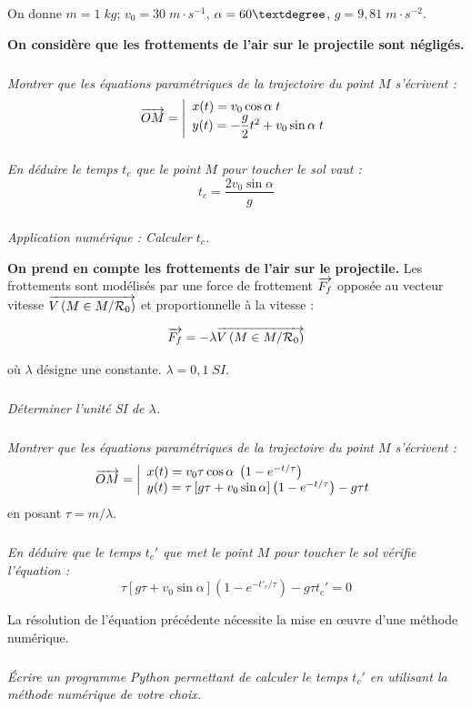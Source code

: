 \documentclass[10pt,oneside]{article}
\begin{document}
On donne $m=1\; kg$; $v_0 = 30\; m \cdot s^{-1}$, $\alpha = 60\textdegree$, $g=9,81\; m\cdot s^{-2}$. 

\textbf{On considère que les frottements de l'air sur le projectile sont négligés.}

\subparagraph{\label{1a}}
\textit{Montrer que les équations paramétriques de la trajectoire du point $M$ s'écrivent :}
\begin{equation}
\overrightarrow{OM} = \left|
\begin{array}{l}
x(t)= v_0 \cos \alpha \; t \\
y(t)=-\dfrac{g}{2}t^2 + v_0 \sin \alpha \; t
\end{array}
\right.
\end{equation}

\subparagraph{\label{1b}}
\textit{En déduire le temps $t_c$ que le point $M$ pour toucher le sol vaut : }
\begin{equation}
t_c = \dfrac{2v_0 \sin \alpha}{g}
\end{equation}

\subparagraph{\label{1c}}
\textit{Application numérique : Calculer $t_c$.}

\textbf{On prend en compte les frottements de l'air sur le projectile.}
Les frottements sont modélisés par une force de frottement $\overrightarrow{F_f}$ opposée au vecteur vitesse $\overrightarrow{V\left( {M} \in {M}/{\mathcal{R}_0}\right)}$ et proportionnelle à la vitesse : 

\begin{equation}
\overrightarrow{F_f} = -\lambda \overrightarrow{V\left( {M} \in {M}/{\mathcal{R}_0}\right)}
\end{equation}

où $\lambda$ désigne une constante. $\lambda = 0,1\; SI$. 

\subparagraph{\label{2a}}
\textit{Déterminer l'unité SI de $\lambda$.}

\subparagraph{\label{2b}}
\textit{Montrer que les équations paramétriques de la trajectoire du point $M$ s'écrivent : }
\begin{equation}
\overrightarrow{OM} = \left|
\begin{array}{l}
x(t)= v_0 \tau \cos \alpha \;\left(1-e^{-t/\tau} \right) \\
y(t)=\tau \left[ g\tau + v_0 \sin \alpha \right]\left( 1-e^{-t/\tau}\right) - g\tau t
\end{array}
\right.
\end{equation}
en posant $\tau=m/\lambda$.

\subparagraph{\label{2c}}
\textit{En déduire que le temps $t_c'$ que met le point $M$ pour toucher le sol vérifie l'équation :}
\begin{equation}
\tau \left[ g\tau + v_0 \sin \alpha \right]\left( 1-e^{-t'_c/\tau}\right) - g\tau t_c' = 0
\end{equation}

La résolution de l'équation précédente nécessite la mise en \oe uvre d'une méthode numérique. 

\subparagraph{\label{3}}
\textit{Écrire un programme Python permettant de calculer le temps $t_c'$ en utilisant la méthode numérique de votre choix.}
\end{document}
